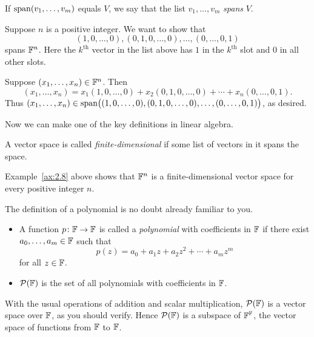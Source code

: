 \begin{definition}[Spans]\label{ax:2.7}
If $\operatorname{span}(v_1,\dots,v_m)$ equals $V$, we say that the list $v_1,\dots,v_m$
\emph{spans} $V$.
\end{definition}

\begin{example}\label{ax:2.8}
Suppose $n$ is a positive integer. We want to show that
\[ (1,0,\dots,0),(0,1,0,\dots,0),\dots,(0,\dots,0,1) \]
spans $\mathbb{F}^n$. Here the $k^{\text{th}}$ vector in the list above has $1$ in the
$k^{\text{th}}$ slot and $0$ in all other slots.

Suppose $(x_1,\dots,x_n)\in\mathbb{F}^n$. Then
\[ (x_1,\dots,x_n) = x_1(1,0,\dots,0)+x_2(0,1,0,\dots,0)+\cdots
   +x_n(0,\dots,0,1). \]
Thus $(x_1,\dots,x_n)\in
\operatorname{span}\bigl((1,0,\dots,0),(0,1,0,\dots,0),\dots,(0,\dots,0,1)\bigr)$, as
desired.
\end{example}

Now we can make one of the key definitions in linear algebra.

\begin{definition}\label{ax:2.9}
A vector space is called \emph{finite-dimensional} if some list of vectors in
it spans the space.
\end{definition}

%
Example~\ref{ax:2.8} above shows that $\mathbb{F}^n$ is a finite-dimensional vector
space for every positive integer $n$.

The definition of a polynomial is no doubt already familiar to you.

\begin{definition}\label{ax:2.10}\leavevmode
\begin{itemize}
\item A function $p\colon\mathbb{F}\to\mathbb{F}$ is called a \emph{polynomial} with
  coefficients in $\mathbb{F}$ if there exist $a_0,\dots,a_m\in\mathbb{F}$ such that
  \[ p(z) = a_0+a_1z+a_2z^2+\cdots+a_mz^m \]
  for all $z\in\mathbb{F}$.
\item $\mathcal{P}(\mathbb{F})$ is the set of all polynomials with coefficients in $\mathbb{F}$.
\end{itemize}
\end{definition}

With the usual operations of addition and scalar multiplication, $\mathcal{P}(\mathbb{F})$ is
a vector space over $\mathbb{F}$, as you should verify. Hence $\mathcal{P}(\mathbb{F})$ is a subspace
of $\mathbb{F}^{\mathbb{F}}$, the vector space of functions from $\mathbb{F}$ to $\mathbb{F}$.


